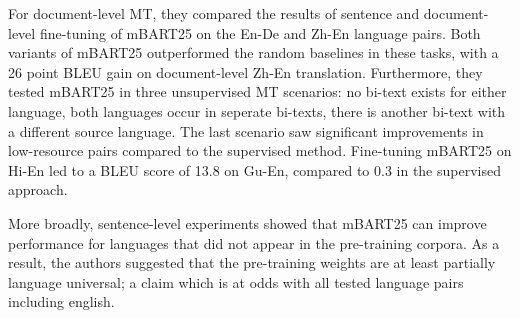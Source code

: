 \documentclass[11pt]{article}
\begin{document}
For document-level MT, they compared the results of sentence and document-level 
fine-tuning of mBART25 on the En-De and Zh-En language pairs. Both variants of mBART25 
outperformed the random baselines in these tasks, 
with a 26 point BLEU gain on document-level Zh-En 
translation. Furthermore, they tested mBART25 in three unsupervised MT scenarios: no bi-text exists for either language, 
both languages occur in seperate bi-texts, there is another bi-text with a different source language. The last scenario saw
significant improvements in low-resource pairs compared to the supervised method. Fine-tuning
mBART25 on Hi-En led to a BLEU score of 13.8 on Gu-En, compared to 0.3 in the supervised approach.

More broadly, sentence-level experiments showed that mBART25 can improve performance 
for languages that did not appear in the pre-training corpora. As a result, the authors suggested
that the pre-training weights are at least partially language universal; a claim which is at odds with all tested language pairs including english.





\end{document}

